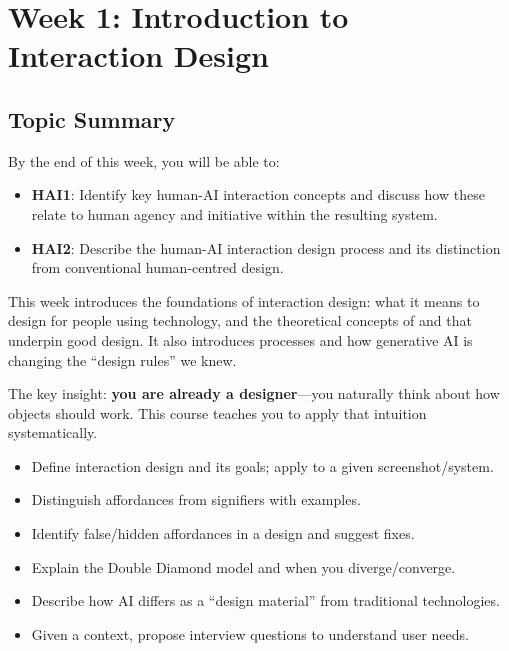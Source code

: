 \section{Week 1: Introduction to Interaction Design}

\subsection{Topic Summary}

\begin{keybox}
By the end of this week, you will be able to:
\begin{itemize}
  \item \textbf{HAI1}: Identify key human-AI interaction concepts and discuss how these relate to human agency and initiative within the resulting system.
  \item \textbf{HAI2}: Describe the human-AI interaction design process and its distinction from conventional human-centred design.
\end{itemize}
\end{keybox}

\begin{keybox}
This week introduces the foundations of interaction design: what it means to design for people using technology, and the theoretical concepts of  and  that underpin good design. It also introduces  processes and how generative AI is changing the ``design rules'' we knew.

The key insight: \textbf{you are already a designer}---you naturally think about how objects should work. This course teaches you to apply that intuition systematically.
\end{keybox}

\begin{keybox}
\begin{itemize}
  \item Define interaction design and its goals; apply to a given screenshot/system.
  \item Distinguish affordances from signifiers with examples.
  \item Identify false/hidden affordances in a design and suggest fixes.
  \item Explain the Double Diamond model and when you diverge/converge.
  \item Describe how AI differs as a ``design material'' from traditional technologies.
  \item Given a context, propose interview questions to understand user needs.
\end{itemize}
\end{keybox}

